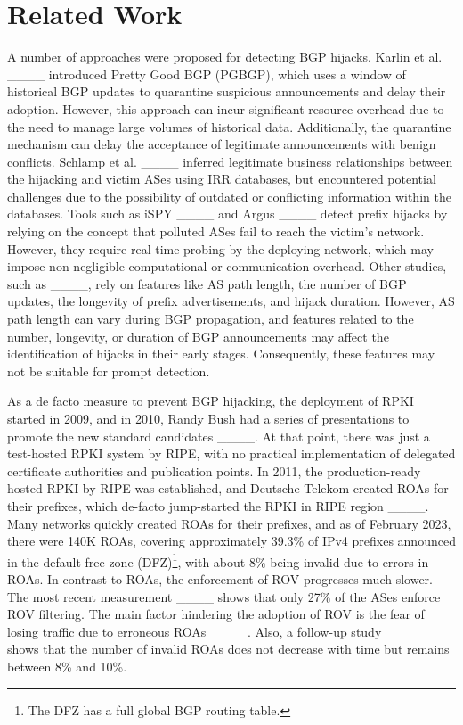 \section{Related Work}
\label{sec:relatedwork}
A number of approaches were proposed for detecting BGP hijacks.
Karlin et al. ____ introduced Pretty Good BGP (PGBGP), which uses a window of historical BGP updates to quarantine suspicious announcements and delay their adoption. However, this approach can incur significant resource overhead due to the need to manage large volumes of historical data. Additionally, the quarantine mechanism can delay the acceptance of legitimate announcements with benign conflicts.
Schlamp et al. ____ inferred legitimate business relationships between the hijacking and victim ASes using IRR databases, but encountered potential challenges due to the possibility of outdated or conflicting information within the databases. Tools such as iSPY ____ and Argus ____ detect prefix hijacks by relying on the concept that polluted ASes fail to reach the victim's network. However, they require real-time probing by the deploying network, which may impose non-negligible computational or communication overhead.
Other studies, such as ____, rely on features like AS path length, the number of BGP updates, the longevity of prefix advertisements, and hijack duration. However, AS path length can vary during BGP propagation, and features related to the number, longevity, or duration of BGP announcements may affect the identification of hijacks in their early stages. Consequently, these features may not be suitable for prompt detection.

As a de facto measure to prevent BGP hijacking, the deployment of RPKI started in 2009, and in 2010, Randy Bush had a series of presentations to promote the new standard candidates ____. At that point, there was just a test-hosted RPKI system by RIPE, with no practical implementation of delegated certificate authorities and publication points. In 2011, the production-ready hosted RPKI by RIPE was established, and Deutsche Telekom created ROAs for their prefixes, which de-facto jump-started the RPKI in RIPE region ____. Many networks quickly created ROAs for their prefixes, and as of February 2023, there were 140K ROAs, covering approximately 39.3\% of IPv4 prefixes announced in the default-free zone (DFZ)\footnote{The DFZ has a full global BGP routing table.}, with about 8\% being invalid due to errors in ROAs. In contrast to ROAs, the enforcement of ROV progresses much slower. The most recent measurement ____ shows that only 27\% of the ASes enforce ROV filtering. The main factor hindering the adoption of ROV is the fear of losing traffic due to erroneous ROAs ____. Also, a follow-up study ____ shows that the number of invalid ROAs does not decrease with time but remains between 8\% and 10\%.

